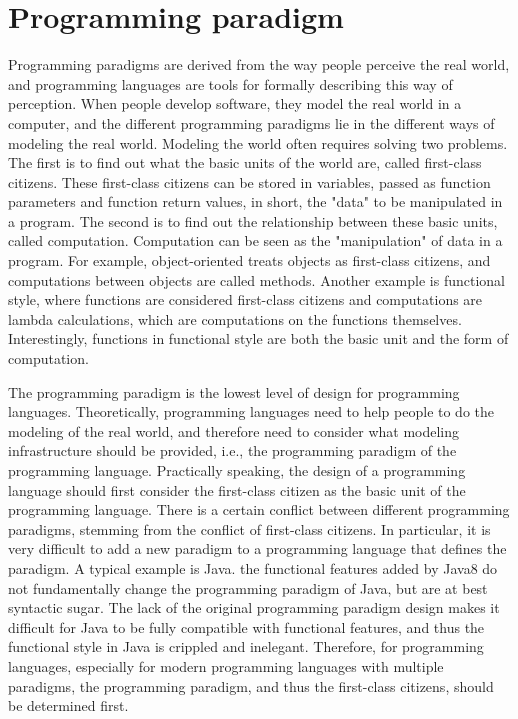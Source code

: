\section{Programming paradigm}

Programming paradigms are derived from the way people perceive the real world, and programming languages are tools for formally describing this way of perception. When people develop software, they model the real world in a computer, and the different programming paradigms lie in the different ways of modeling the real world. Modeling the world often requires solving two problems. The first is to find out what the basic units of the world are, called first-class citizens. These first-class citizens can be stored in variables, passed as function parameters and function return values, in short, the "data" to be manipulated in a program. The second is to find out the relationship between these basic units, called computation. Computation can be seen as the "manipulation" of data in a program. For example, object-oriented treats objects as first-class citizens, and computations between objects are called methods. Another example is functional style, where functions are considered first-class citizens and computations are lambda calculations, which are computations on the functions themselves. Interestingly, functions in functional style are both the basic unit and the form of computation.

The programming paradigm is the lowest level of design for programming languages. Theoretically, programming languages need to help people to do the modeling of the real world, and therefore need to consider what modeling infrastructure should be provided, i.e., the programming paradigm of the programming language. Practically speaking, the design of a programming language should first consider the first-class citizen as the basic unit of the programming language. There is a certain conflict between different programming paradigms, stemming from the conflict of first-class citizens. In particular, it is very difficult to add a new paradigm to a programming language that defines the paradigm. A typical example is Java. the functional features added by Java8 do not fundamentally change the programming paradigm of Java, but are at best syntactic sugar. The lack of the original programming paradigm design makes it difficult for Java to be fully compatible with functional features, and thus the functional style in Java is crippled and inelegant. Therefore, for programming languages, especially for modern programming languages with multiple paradigms, the programming paradigm, and thus the first-class citizens, should be determined first.

